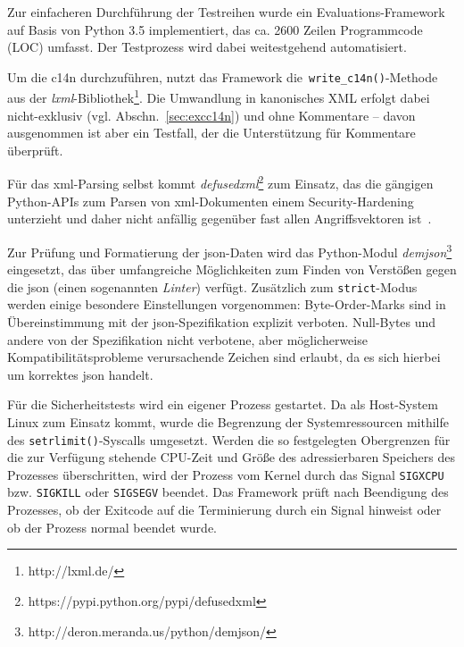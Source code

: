 
Zur einfacheren Durchführung der Testreihen wurde ein Evaluations-Framework auf Basis von Python 3.5 implementiert, das ca. 2600 Zeilen Programmcode (LOC) umfasst. Der Testprozess wird dabei weitestgehend automatisiert.

Um die \acrlong{c14n} durchzuführen, nutzt das Framework die~\texttt{write_c14n()}-Methode aus der \emph{lxml}-Bibliothek\footnote{http://lxml.de/}. Die Umwandlung in kanonisches XML erfolgt dabei nicht-exklusiv (vgl. Abschn.~\ref{sec:excc14n}) und ohne Kommentare -- davon ausgenommen ist aber ein Testfall, der die Unterstützung für Kommentare überprüft.

Für das \acrshort{xml}-Parsing selbst kommt \emph{defusedxml}\footnote{https://pypi.python.org/pypi/defusedxml} zum Einsatz, das die gängigen Python-APIs zum Parsen von \acrshort{xml}-Dokumenten einem Security-Hardening unterzieht und daher nicht anfällig gegenüber fast allen Angriffsvektoren ist~\cite[Abschn.~9.5]{spaeth2016sok}.

Zur Prüfung und Formatierung der \acrshort{json}-Daten wird das Python-Modul \emph{demjson}\footnote{http://deron.meranda.us/python/demjson/} eingesetzt, das über umfangreiche Möglichkeiten zum Finden von Verstößen gegen die \acrshort{json} (einen sogenannten \emph{Linter}) verfügt. Zusätzlich zum \texttt{strict}-Modus werden einige besondere Einstellungen vorgenommen: Byte-Order-Marks sind in Übereinstimmung mit der \acrshort{json}-Spezifikation explizit verboten. Null-Bytes und andere von der Spezifikation nicht verbotene, aber möglicherweise Kompatibilitätsprobleme verursachende Zeichen sind erlaubt, da es sich hierbei um korrektes \acrshort{json} handelt.

Für die Sicherheitstests wird ein eigener Prozess gestartet. Da als Host-System Linux zum Einsatz kommt, wurde die Begrenzung der Systemressourcen mithilfe des \texttt{setrlimit()}-Syscalls umgesetzt. Werden die so festgelegten Obergrenzen für die zur Verfügung stehende CPU-Zeit und Größe des adressierbaren Speichers des Prozesses überschritten, wird der Prozess vom Kernel durch das Signal \texttt{SIGXCPU} bzw. \texttt{SIGKILL} oder \texttt{SIGSEGV} beendet. Das Framework prüft nach Beendigung des Prozesses, ob der Exitcode auf die Terminierung durch ein Signal hinweist oder ob der Prozess normal beendet wurde.
